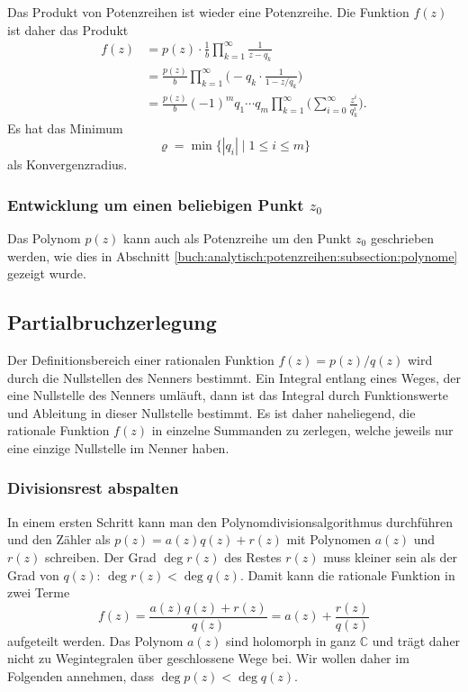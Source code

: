 Das Produkt von Potenzreihen ist wieder eine Potenzreihe.
Die Funktion $f(z)$ ist daher das Produkt
\begin{align*}
f(z)
&=
p(z)
\cdot
\frac{1}{b}
\prod_{k=1}^\infty
\frac{1}{z-q_k}
\\
&=
\frac{p(z)}{b}
\prod_{k=1}^\infty
\Biggl(
-q_k
\cdot
\frac{1}{\displaystyle 1-z/q_k}
\Biggr)
\\
&=
\frac{p(z)}{b}
(-1)^m
q_1\cdots q_m
\prod_{k=1}^\infty
\Biggr(
\sum_{i=0}^\infty
\frac{z^i}{q_k^i}
\Biggr).
\end{align*}
Es hat das Minimum
\[
\varrho 
=
\min
\{|q_i|\mid 1\le i\le m\}
\]
als Konvergenzradius.

%
%
\subsubsection{Entwicklung um einen beliebigen Punkt $z_0$}
Das Polynom $p(z)$ kann auch als Potenzreihe um den Punkt $z_0$
geschrieben werden, wie dies in Abschnitt
\ref{buch:analytisch:potenzreihen:subsection:polynome}
gezeigt wurde.

%
%
\subsection{Partialbruchzerlegung
\label{buch:analytisch:rational:subsection:partialbruch}}
Der Definitionsbereich einer rationalen Funktion $f(z)=p(z)/q(z)$
wird durch die Nullstellen des Nenners bestimmt.
Ein Integral entlang eines Weges, der eine Nullstelle des Nenners
umläuft, dann ist das Integral durch Funktionswerte und 
Ableitung in dieser Nullstelle bestimmt.
Es ist daher naheliegend, die rationale Funktion $f(z)$ in
einzelne Summanden zu zerlegen, welche jeweils nur eine einzige
Nullstelle im Nenner haben.

%
%
\subsubsection{Divisionsrest abspalten}
In einem ersten Schritt kann man den Polynomdivisionsalgorithmus
durchführen und den Zähler als $p(z) = a(z)q(z) + r(z)$ mit
Polynomen $a(z)$ und $r(z)$ schreiben.
Der Grad $\deg r(z)$ des Restes $r(z)$ muss kleiner sein als
der Grad von $q(z)$: $\deg r(z) <\deg q(z)$.
Damit kann die rationale Funktion in zwei Terme
\[
f(z)
=
\frac{a(z)q(z)+r(z)}{q(z)}
=
a(z)
+
\frac{r(z)}{q(z)}
\]
aufgeteilt werden.
Das Polynom $a(z)$ sind holomorph in ganz $\mathbb{C}$ und trägt
daher nicht zu Wegintegralen über geschlossene Wege bei.
Wir wollen daher im Folgenden annehmen, dass $\deg p(z)<\deg q(z)$.

